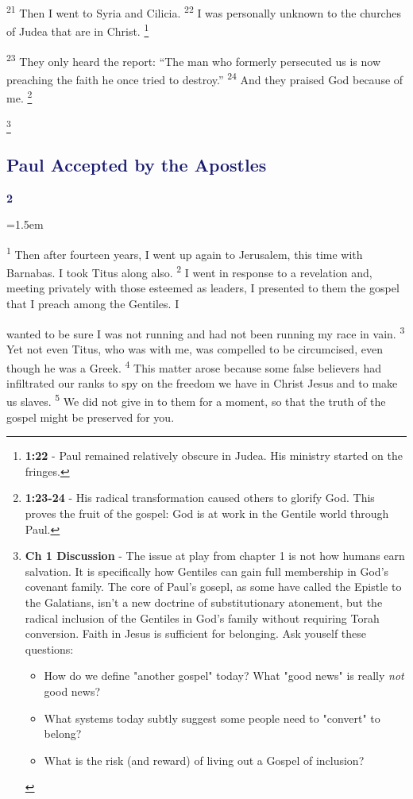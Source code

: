 \documentclass[12pt,twoside]{article}
\newcommand{\vs}[1]{\textsuperscript{#1}}
\newcommand{\vnote}[2]{%
  \begingroup
  \renewcommand\thefootnote{}%
  \footnote{\scriptsize \textbf{}#2}%
  \addtocounter{footnote}{-1}%
  \endgroup
}
\newcommand{\chapterWithIndent}[2]{%
  \noindent
  \begin{minipage}[t]{1cm}
    \vspace{-0.4\baselineskip}
    {\textcolor{MidnightBlue}{\fontsize{40pt}{48pt}\selectfont \textbf{#1}}}
  \end{minipage}%
  \hspace{0.3cm}%
  \begin{minipage}[t]{\dimexpr\linewidth - 1.5cm - 0.3cm\relax}
    \hangindent=1.5em
    \hangafter=3
    #2
    \vspace{0.05cm}
  \end{minipage}
}
\begin{document}
\vs{21} Then I went to Syria and Cilicia.
\vs{22} I was personally unknown to the churches of Judea that are in Christ.\vnote{22}{\textbf{1:22} - Paul remained relatively obscure in Judea. His ministry started on the fringes.}
\vs{23} They only heard the report: ``The man who formerly persecuted us is now preaching the faith he once tried to destroy.''
\vs{24} And they praised God because of me.\vnote{24}{\textbf{1:23-24} - His radical transformation caused others to glorify God. This proves the fruit of the gospel: God is at work in the Gentile world through Paul.}
\vnote{24}{\textbf{Ch 1 Discussion} - The issue at play from chapter 1 is not how humans earn salvation. It is specifically how Gentiles can gain full membership in God's covenant family. The core of Paul's gosepl, as some have called the Epistle to the Galatians, isn't a new doctrine of substitutionary atonement, but the radical inclusion of the Gentiles in God's family without requiring Torah conversion. Faith in Jesus is sufficient for belonging. Ask youself these questions:
\begin{itemize}
    \item How do we define "another gospel" today? What "good news" is really \textit{not} good news?
    \item What systems today subtly suggest some people need to "convert" to belong?
    \item What is the risk (and reward) of living out a Gospel of inclusion?
\end{itemize}
}

\subsection*{{\textcolor{MidnightBlue}{\textbf{Paul Accepted by the Apostles}}}}

\chapterWithIndent{2}{
    \vs{1} Then after fourteen years, I went up again to Jerusalem, this time with Barnabas. I took Titus along also.
    \vs{2} I went in response to a revelation and, meeting privately with those esteemed as leaders, I presented to them the gospel that I preach among the Gentiles. I
}

\noindent wanted to be sure I was not running and had not been running my race in vain.
\vs{3} Yet not even Titus, who was with me, was compelled to be circumcised, even though he was a Greek.
\vs{4} This matter arose because some false believers had infiltrated our ranks to spy on the freedom we have in Christ Jesus and to make us slaves.
\vs{5} We did not give in to them for a moment, so that the truth of the gospel might be preserved for you.
\end{document}
